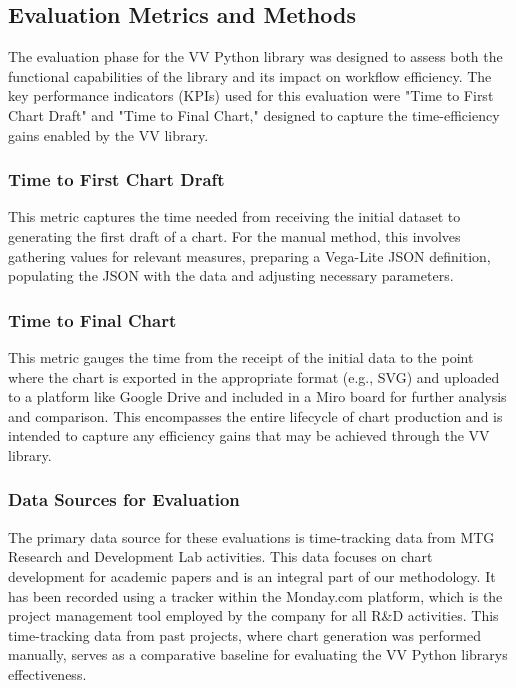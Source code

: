 \subsection{Evaluation Metrics and
Methods}\label{evaluation-metrics-and-methods}

The evaluation phase for the VV Python library was designed to assess
both the functional capabilities of the library and its impact on
workflow efficiency. The key performance indicators (KPIs) used for this
evaluation were "Time to First Chart Draft" and "Time to Final Chart,"
designed to capture the time-efficiency gains enabled by the VV library.

\subsubsection{Time to First Chart
Draft}\label{time-to-first-chart-draft}

This metric captures the time needed from receiving the initial dataset
to generating the first draft of a chart. For the manual method, this
involves gathering values for relevant measures, preparing a Vega-Lite
JSON definition, populating the JSON with the data and adjusting
necessary parameters.

\subsubsection{Time to Final Chart}\label{time-to-final-chart}

This metric gauges the time from the receipt of the initial data to the
point where the chart is exported in the appropriate format (e.g., SVG)
and uploaded to a platform like Google Drive and included in a Miro
board for further analysis and comparison. This encompasses the entire
lifecycle of chart production and is intended to capture any efficiency
gains that may be achieved through the VV library.

\subsubsection{Data Sources for
Evaluation}\label{data-sources-for-evaluation}

The primary data source for these evaluations is time-tracking data from
MTG Research and Development Lab activities. This data focuses on chart
development for academic papers and is an integral part of our
methodology. It has been recorded using a tracker within the Monday.com
platform, which is the project management tool employed by the company
for all R\&D activities. This time-tracking data from past projects,
where chart generation was performed manually, serves as a comparative
baseline for evaluating the VV Python library\textquotesingle s
effectiveness.

